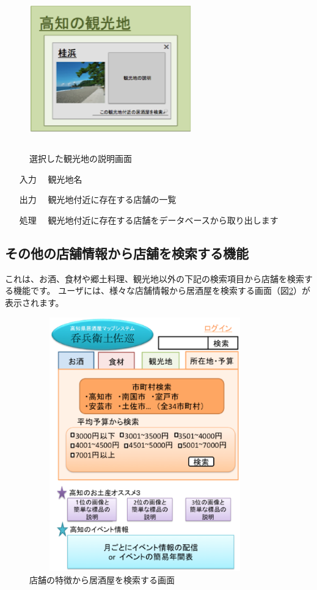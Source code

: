 \documentclass[a4j,titlepage]{jarticle}
\begin{document}
\begin {figure}[htbp]
    \begin{center}
    \includegraphics [height=7cm, width=7cm]{extrnal_design_document_image/11.eps}
    \caption {選択した観光地の説明画面}
    \label {fig:11}
    \end{center}
\end {figure}

\begin{enumerate}
  \item [入力]　観光地名
  \item [出力]　観光地付近に存在する店舗の一覧
  \item [処理]　観光地付近に存在する店舗をデータベースから取り出します
\end{enumerate}

\newpage
\subsection{その他の店舗情報から店舗を検索する機能}
これは、お酒、食材や郷土料理、観光地以外の下記の検索項目から店舗を検索する機能です。
ユーザには、様々な店舗情報から居酒屋を検索する画面（図\ref{fig:12}）が表示されます。

\begin {figure}[htbp]
    \begin{center}
    \includegraphics [height=11cm, width=10cm]{extrnal_design_document_image/12.eps}
    \caption {店舗の特徴から居酒屋を検索する画面}
    \label {fig:12}
    \end{center}
\end {figure}
\end{document}
